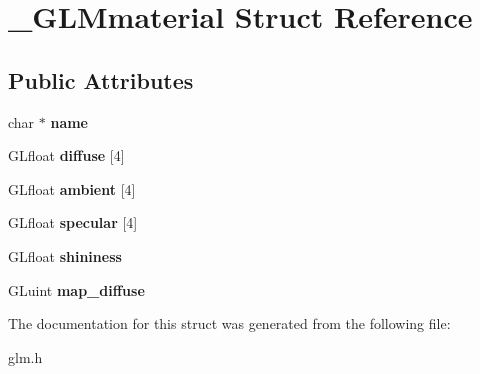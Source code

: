 \hypertarget{struct__GLMmaterial}{\section{\-\_\-\-G\-L\-Mmaterial \-Struct \-Reference}
\label{struct__GLMmaterial}
}
\subsection*{\-Public \-Attributes}
\begin{DoxyCompactItemize}
\item 
\hypertarget{struct__GLMmaterial_a5aabee911354d036897d176132348601}{char $\ast$ {\bfseries name}}\label{struct__GLMmaterial_a5aabee911354d036897d176132348601}

\item 
\hypertarget{struct__GLMmaterial_a4602d91041b40f1f95f426ee5d71fc89}{\-G\-Lfloat {\bfseries diffuse} \mbox{[}4\mbox{]}}\label{struct__GLMmaterial_a4602d91041b40f1f95f426ee5d71fc89}

\item 
\hypertarget{struct__GLMmaterial_a5009f171fe38cc6da03b637efa1fb116}{\-G\-Lfloat {\bfseries ambient} \mbox{[}4\mbox{]}}\label{struct__GLMmaterial_a5009f171fe38cc6da03b637efa1fb116}

\item 
\hypertarget{struct__GLMmaterial_a8a7847baa3892039f974d5bf4aa993be}{\-G\-Lfloat {\bfseries specular} \mbox{[}4\mbox{]}}\label{struct__GLMmaterial_a8a7847baa3892039f974d5bf4aa993be}

\item 
\hypertarget{struct__GLMmaterial_a42623b39a8c3a06131750bca1cd83347}{\-G\-Lfloat {\bfseries shininess}}\label{struct__GLMmaterial_a42623b39a8c3a06131750bca1cd83347}

\item 
\hypertarget{struct__GLMmaterial_a00d9ef30c351df5e708fcfdad6e74260}{\-G\-Luint {\bfseries map\-\_\-diffuse}}\label{struct__GLMmaterial_a00d9ef30c351df5e708fcfdad6e74260}

\end{DoxyCompactItemize}


\-The documentation for this struct was generated from the following file\-:\begin{DoxyCompactItemize}
\item 
glm.\-h\end{DoxyCompactItemize}

